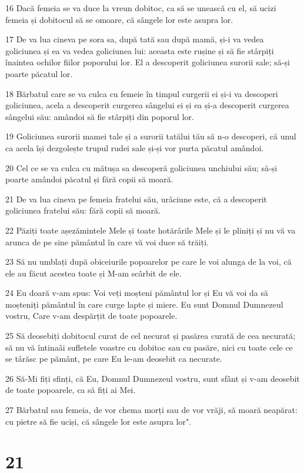 \par 16 Dacă femeia se va duce la vreun dobitoc, ca să se unească cu el, să ucizi femeia și dobitocul să se omoare, că sângele lor este asupra lor.
\par 17 De va lua cineva pe sora sa, după tată sau după mamă, și-i va vedea goliciunea și ea va vedea goliciunea lui: aceasta este rușine și să fie stârpiți înaintea ochilor fiilor poporului lor. El a descoperit goliciunea surorii sale; să-și poarte păcatul lor.
\par 18 Bărbatul care se va culca cu femeie în timpul curgerii ei și-i va descoperi goliciunea, acela a descoperit curgerea sângelui ei și ea și-a descoperit curgerea sângelui său: amândoi să fie stârpiți din poporul lor.
\par 19 Goliciunea surorii mamei tale și a surorii tatălui tău să n-o descoperi, că unul ca acela își dezgolește trupul rudei sale și-și vor purta păcatul amândoi.
\par 20 Cel ce se va culca cu mătușa sa descoperă goliciunea unchiului său; să-și poarte amândoi păcatul și fără copii să moară.
\par 21 De va lua cineva pe femeia fratelui său, urâciune este, că a descoperit goliciunea fratelui său: fără copii să moară.
\par 22 Păziți toate așezămintele Mele și toate hotărârile Mele și le pliniți și nu vă va arunca de pe sine pământul în care vă voi duce să trăiți.
\par 23 Să nu umblați după obiceiurile popoarelor pe care le voi alunga de la voi, că ele au făcut acestea toate și M-am scârbit de ele.
\par 24 Eu doară v-am spus: Voi veți moșteni pământul lor și Eu vă voi da să moșteniți pământul în care curge lapte și miere. Eu sunt Domnul Dumnezeul vostru, Care v-am despărțit de toate popoarele.
\par 25 Să deosebiți dobitocul curat de cel necurat și pasărea curată de cea necurată; să nu vă întinaâi sufletele voastre cu dobitoc sau cu pasăre, nici cu toate cele ce se târăsc pe pământ, pe care Eu le-am deosebit ca necurate.
\par 26 Să-Mi fiți sfinți, că Eu, Domnul Dumnezeul vostru, sunt sfânt și v-am deosebit de toate popoarele, ca să fiți ai Mei.
\par 27 Bărbatul sau femeia, de vor chema morți sau de vor vrăji, să moară neapărat: cu pietre să fie uciși, că sângele lor este asupra lor".

\chapter{21}

